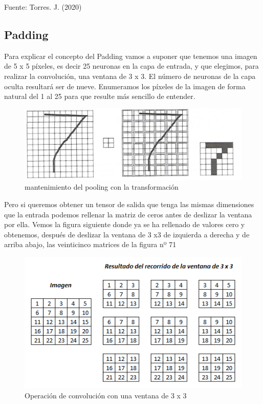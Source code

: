 \documentclass[
  a4paper,
  DIV=11,
  numbers=noendperiod]{scrreprt}
\begin{document}
Fuente: Torres. J. (2020)

\hypertarget{padding}{%
\subsection{Padding}\label{padding}}

Para explicar el concepto del Padding vamos a suponer que tenemos una
imagen de 5 x 5 píxeles, es decir 25 neuronas en la capa de entrada, y
que elegimos, para realizar la convolución, una ventana de 3 x 3. El
número de neuronas de la capa oculta resultará ser de nueve. Enumeramos
los píxeles de la imagen de forma natural del 1 al 25 para que resulte
más sencillo de entender.

\begin{figure}

{\centering \includegraphics{imagenes/capitulo1/transformacion_pooling.png}

}

\caption{\label{fig-transformacion-pooling}mantenimiento del pooling con
la transformación}

\end{figure}

Pero si queremos obtener un tensor de salida que tenga las mismas
dimensiones que la entrada podemos rellenar la matriz de ceros antes de
deslizar la ventana por ella. Vemos la figura siguiente donde ya se ha
rellenado de valores cero y obtenemos, después de deslizar la ventana de
3 x3 de izquierda a derecha y de arriba abajo, las veinticinco matrices
de la figura nº 71

\begin{figure}

{\centering \includegraphics{imagenes/capitulo1/sin_padding.png}

}

\caption{\label{fig-sin-padding}Operación de convolución con una ventana
de 3 x 3}

\end{figure}
\end{document}
